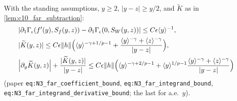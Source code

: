 \begin{lemma}
  \label{lem:c10_far_plus_integrand}
  With the standing assumptions, $y\ge2$, $|y-z|\ge y/2$, and $\widetilde K$ as in
  \cref{lem:c10_far_subtraction}:
  \begin{align*}
    &|\partial_1\Gamma_\epsilon(f'(y),S_f(y,z))-\partial_1\Gamma_\epsilon(0,S_W(y,z))|\le C\epsilon\langle y \rangle^{-1},\\
    &|\widetilde K(y,z)|\le C\epsilon\|h\|\Bigl(\langle y \rangle^{-\gamma+1/p-1}+\frac{\langle y \rangle^{-\gamma}+\langle z \rangle^{-\gamma}}{|y-z|}\Bigr),\\
    &\Bigl|\partial_y\widetilde K(y,z)\Bigr|+\frac{|\widetilde K(y,z)|}{|y-z|}\le C\epsilon\|h\|\Bigl(\langle y \rangle^{-\gamma+2/p-1}+\langle y \rangle^{1/p-1}\frac{\langle y \rangle^{-\gamma}+\langle z \rangle^{-\gamma}}{|y-z|}\Bigr)
  \end{align*}
  (paper \texttt{eq:N3\_far\_coefficient\_bound}, \texttt{eq:N3\_far\_integrand\_bound},
  \texttt{eq:N3\_far\_integrand\_derivative\_bound}; the last for a.e.\ $y$).
\end{lemma}
